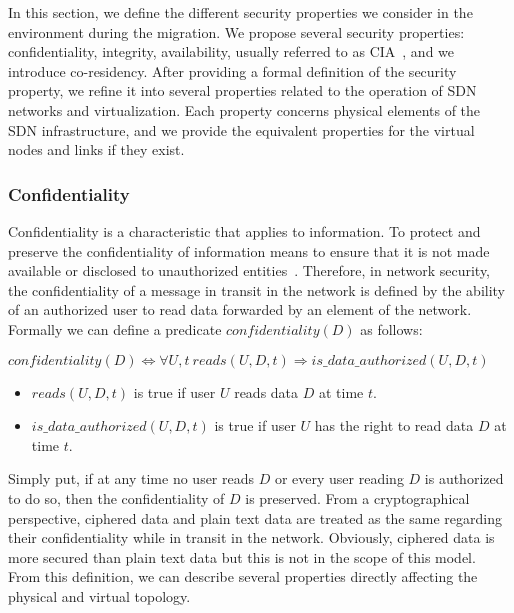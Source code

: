 \label{sec:security_prop}
In this section, we define the different security properties we consider in the environment during the migration.
We propose several security properties: confidentiality, integrity, availability, usually referred to as CIA~\cite{ISO/IEC270012013}, and we introduce co-residency.
After providing a formal definition of the security property, we refine it into several properties related to the operation of SDN networks and virtualization. Each property concerns physical elements of the SDN infrastructure, and we provide the equivalent properties for the virtual nodes and links if they exist. 

\subsubsection{Confidentiality}
\label{sec:prop-conf}
Confidentiality is a characteristic that applies to information.
To protect and preserve the confidentiality of information means to ensure that it is not made available or disclosed to unauthorized entities~\cite{ISO/IEC270012013}.
Therefore, in network security, the confidentiality of a message in transit in the network is defined by the ability of an authorized  user to read data forwarded by an element of the network.
Formally we can define a predicate $confidentiality(D)$ as follows:

\begin{myformula}
$ confidentiality(D) \Leftrightarrow \forall U,t~reads(U,D,t) \Rightarrow is\_data\_authorized(U,D,t)$
\end{myformula}

\begin{itemize}
\item $reads(U,D,t)$ is true if user $U$ reads data $D$ at time $t$.
\item $is\_data\_authorized(U,D,t)$ is true if user $U$ has the right to read data $D$ at time $t$.
\end{itemize}
Simply put, if at any time no user reads $D$ or every user reading $D$ is authorized to do so, then the confidentiality of $D$ is preserved.
From a cryptographical perspective, ciphered data and plain text data are treated as the same regarding their confidentiality while in transit in the network.
Obviously, ciphered data is more secured than plain text data but this is not in the scope of this model.\\
From this definition, we can describe several properties directly affecting the physical and virtual topology.


